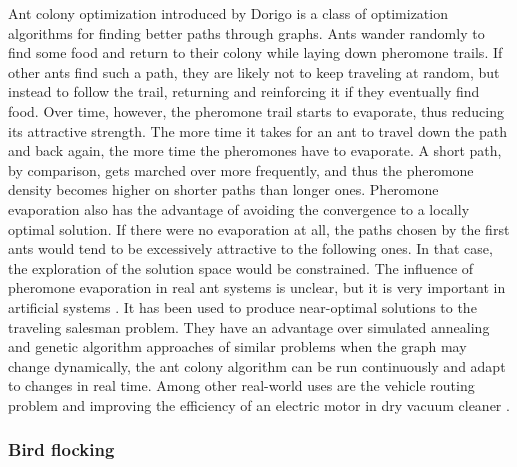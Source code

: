 Ant colony optimization  introduced by Dorigo \cite{Dorigo96Ants} is a class of optimization algorithms for finding better paths through graphs. Ants wander randomly to find some food and return to their colony while laying down pheromone trails. If other ants find such a path, they are likely not to keep traveling at random, but instead to follow the trail, returning and reinforcing it if they eventually find food. Over time, however, the pheromone trail starts to evaporate, thus reducing its attractive strength. The more time it takes for an ant to travel down the path and back again, the more time the pheromones have to evaporate. A short path, by comparison, gets marched over more frequently, and thus the pheromone density becomes higher on shorter paths than longer ones. Pheromone evaporation also has the advantage of avoiding the convergence to a locally optimal solution. If there were no evaporation at all, the paths chosen by the first ants would tend to be excessively attractive to the following ones. In that case, the exploration of the solution space would be constrained. The influence of pheromone evaporation in real ant systems is unclear, but it is very important in artificial systems \cite{Dorigo04Ants}. It has been used to produce near-optimal solutions to the traveling salesman problem. They have an advantage over simulated annealing and genetic algorithm approaches of similar problems when the graph may change dynamically, the ant colony algorithm can be run continuously and adapt to changes in real time. Among other real-world uses are the vehicle routing problem \cite{Rizzoli07AntsVehicle} and improving the efficiency of an electric motor in dry vacuum cleaner \cite{Korosec09AntsVacuum}.


\subsubsection{Bird flocking} %
\label{ssub:bird_flocking}

